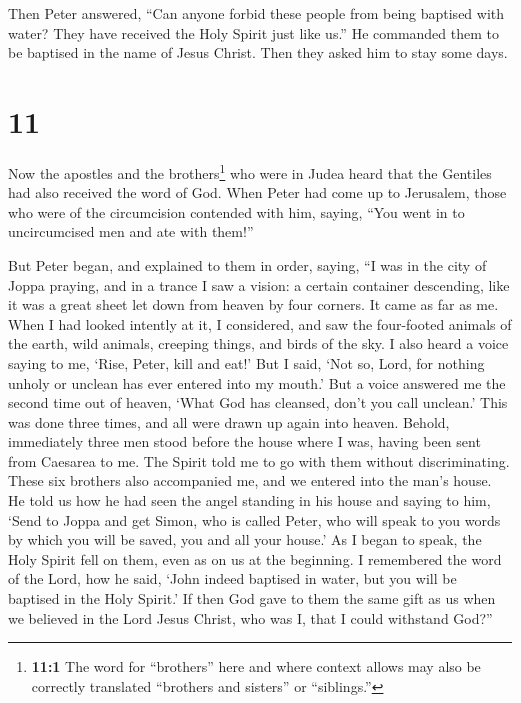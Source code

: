 Then Peter answered,  ``Can anyone forbid these people
from being baptised with water? They have received the Holy Spirit just
like us.''  He commanded them to be baptised in the name
of Jesus Christ. Then they asked him to stay some days.

\hypertarget{section-10}{%
\section{11}\label{section-10}}

 Now the apostles and the brothers\footnote{\textbf{11:1}
  The word for ``brothers'' here and where context allows may also be
  correctly translated ``brothers and sisters'' or ``siblings.''} who
were in Judea heard that the Gentiles had also received the word of God.
 When Peter had come up to Jerusalem, those who were of
the circumcision contended with him,  saying, ``You went
in to uncircumcised men and ate with them!''

 But Peter began, and explained to them in order, saying,
 ``I was in the city of Joppa praying, and in a trance I
saw a vision: a certain container descending, like it was a great sheet
let down from heaven by four corners. It came as far as me.
 When I had looked intently at it, I considered, and saw
the four-footed animals of the earth, wild animals, creeping things, and
birds of the sky.  I also heard a voice saying to me,
`Rise, Peter, kill and eat!'  But I said, `Not so, Lord,
for nothing unholy or unclean has ever entered into my mouth.'
 But a voice answered me the second time out of heaven,
`What God has cleansed, don't you call unclean.'  This
was done three times, and all were drawn up again into heaven.
 Behold, immediately three men stood before the house
where I was, having been sent from Caesarea to me.  The
Spirit told me to go with them without discriminating. These six
brothers also accompanied me, and we entered into the man's house.
 He told us how he had seen the angel standing in his
house and saying to him, `Send to Joppa and get Simon, who is called
Peter,  who will speak to you words by which you will be
saved, you and all your house.'  As I began to speak, the
Holy Spirit fell on them, even as on us at the beginning.
 I remembered the word of the Lord, how he said, `John
indeed baptised in water, but you will be baptised in the Holy Spirit.'
 If then God gave to them the same gift as us when we
believed in the Lord Jesus Christ, who was I, that I could withstand
God?''

